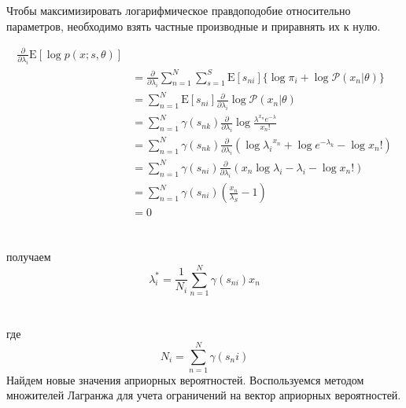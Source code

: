 \documentclass{matmex-diploma}
\begin{document}
Чтобы максимизировать логарифмическое правдоподобие относительно параметров, необходимо взять частные производные и приравнять их к нулю.

\begin{align*}
\frac{\partial}{\partial \lambda_i}\mathrm{E}[\log p(x;s,\theta)]\\
&=\frac{\partial}{\partial \lambda_i}\sum_{n=1}^N \sum_{s=1}^S
\mathrm{E}[s_{ni}]\{\log \pi_i + \log \mathcal{P}(x_n|\theta)\}\\
&= \sum_{n=1}^N \mathrm{E}[s_{ni}] \frac{\partial}{\partial \lambda_i} \log \mathcal{P}(x_n|\theta)\\
&= \sum_{n=1}^N \gamma(s_{nk}) \frac{\partial}{\partial \lambda_i} \log {\frac{\lambda^{x_n} e^{-\lambda}}{x_n!}}\\
&= \sum_{n=1}^N \gamma(s_{nk}) \frac{\partial}{\partial \lambda_i} (\log {\lambda_i}^{x_n} + \log e^{-\lambda_k} - \log x_n! )\\
&= \sum_{n=1}^N \gamma(s_{ni}) \frac{\partial}{\partial \lambda_i} (x_n \log \lambda_i - \lambda_i - \log x_n! )\\
&= \sum_{n=1}^N \gamma(s_{ni}) (\frac{x_n}{\lambda_S} - 1)\\
&= 0
\end{align*}
\\\\
получаем
\begin{equation}
\lambda_i^* = \frac{1}{N_i}\sum_{n=1}^N\gamma(s_{ni})x_n
\end{equation}
\\\\
где
\begin{equation}
N_i = \sum_{n=1}^N\gamma(s_ni)
\end{equation}
Найдем новые значения априорных вероятностей.
Воспользуемся методом множителей Лагранжа для учета ограничений на вектор априорных вероятностей.
\end{document}
